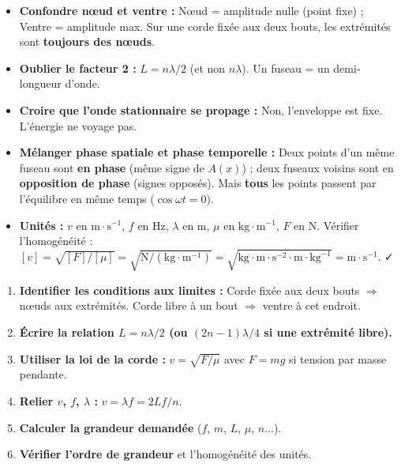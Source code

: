 \documentclass[11pt]{article}
\begin{document}
\begin{attention}
\begin{itemize}
\item \textbf{Confondre nœud et ventre :} Nœud = amplitude nulle (point fixe) ; Ventre = amplitude max. Sur une corde fixée aux deux bouts, les extrémités sont \textbf{toujours des nœuds}.
\item \textbf{Oublier le facteur 2 :} $L = n\lambda/2$ (et non $n\lambda$). Un fuseau = un demi-longueur d'onde.
\item \textbf{Croire que l'onde stationnaire se propage :} Non, l'enveloppe est fixe. L'énergie ne voyage pas.
\item \textbf{Mélanger phase spatiale et phase temporelle :} Deux points d'un même fuseau sont \textbf{en phase} (même signe de $A(x)$) ; deux fuseaux voisins sont en \textbf{opposition de phase} (signes opposés). Mais \textbf{tous} les points passent par l'équilibre en même temps ($\cos\omega t=0$).
\item \textbf{Unités :} $v$ en $\text{m}\cdot\text{s}^{-1}$, $f$ en $\text{Hz}$, $\lambda$ en $\text{m}$, $\mu$ en $\text{kg}\cdot\text{m}^{-1}$, $F$ en $\text{N}$. Vérifier l'homogénéité : $[v] = \sqrt{[F]/[\mu]} = \sqrt{\text{N}/(\text{kg}\cdot\text{m}^{-1})} = \sqrt{\text{kg}\cdot\text{m}\cdot\text{s}^{-2}\cdot\text{m}\cdot\text{kg}^{-1}} = \text{m}\cdot\text{s}^{-1}$. ✓
\end{itemize}
\end{attention}

\begin{methode}
\begin{enumerate}
\item \textbf{Identifier les conditions aux limites :} Corde fixée aux deux bouts $\Rightarrow$ nœuds aux extrémités. Corde libre à un bout $\Rightarrow$ ventre à cet endroit.
\item \textbf{Écrire la relation $L = n\lambda/2$ (ou $(2n-1)\lambda/4$ si une extrémité libre).}
\item \textbf{Utiliser la loi de la corde :} $v = \sqrt{F/\mu}$ avec $F=mg$ si tension par masse pendante.
\item \textbf{Relier $v$, $f$, $\lambda$ :} $v = \lambda f = 2Lf/n$.
\item \textbf{Calculer la grandeur demandée} ($f$, $m$, $L$, $\mu$, $n$...).
\item \textbf{Vérifier l'ordre de grandeur} et l'homogénéité des unités.
\end{enumerate}
\end{methode}
\end{document}
